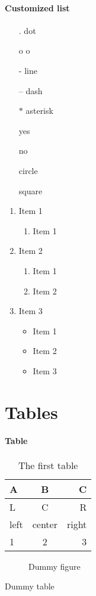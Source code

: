 \documentclass{article}
\begin{document}
\paragraph{Customized list}
\begin{itemize}
\item[.] dot
\item[o] o
\item[-] line
\item[--] dash
\item[$\ast$] asterisk
\item[\ding{51}] yes
\item[\ding{56}] no
\item[\ding{108}] circle
\item[\ding{110}] square
\end{itemize}
\begin{enumerate}[label=(\arabic*)] 
\item Item 1
	\begin{enumerate}[label=\Alph*.] 
	\item Item 1
	\end{enumerate}
\item Item 2
	\begin{enumerate}[label=\roman*.] 
	\item Item 1
	\item Item 2
	\end{enumerate}
\item Item 3
	\begin{itemize}[label=$\circ$] 
	\item Item 1
	\item Item 2
	\item Item 3
	\end{itemize}
\end{enumerate}
\newpage

\section{Tables}
\paragraph{Table}
\begin{table}[h!]
  \begin{center}
		\begin{tabular}{| l | c | r |}
			\hline
			\textbf{A} & \textbf{B} & \textbf{C}\\
			\hline
			L & C & R\\
			left & center & right\\
			\hline
			1 & 2 & 3\\
			\hline
		\end{tabular}
		\caption{The first table}
		\label{table:table1}
  \end{center}
\end{table}

\begin{figure}
  \caption{Dummy figure}
\end{figure}

\begin{table}
  \caption{Dummy table}
\end{table}
\newpage

\begin{appendix}
  \listoffigures
  \listoftables
\end{appendix}
\end{document}
